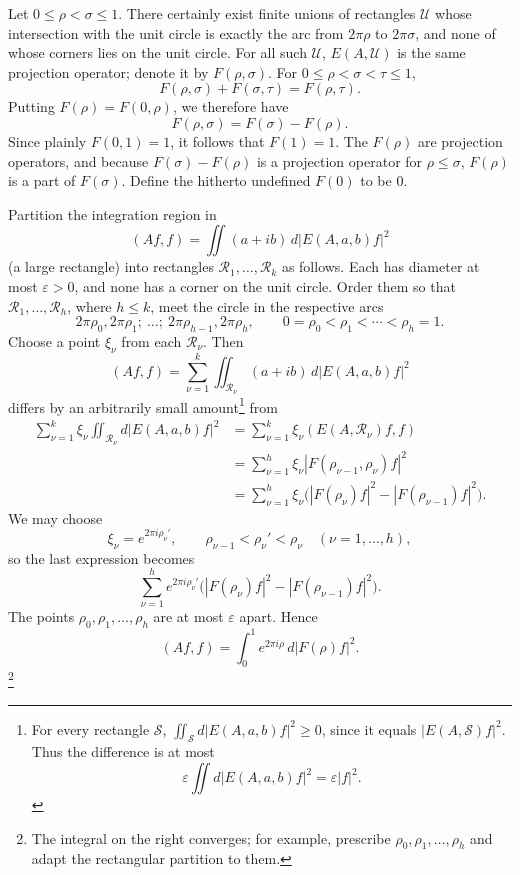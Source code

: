 ﻿\documentclass[paper=b5,fontsize=13pt,bookmarkpackage=false,twoside]{scrartcl}
\begin{document}
Let \(0\leq\rho<\sigma\leq1\).  There certainly exist finite unions of
rectangles \(\mathcal U\) whose intersection with the unit circle is
exactly the arc from \(2\pi\rho\) to \(2\pi\sigma\), and none of whose
corners lies on the unit circle.  For all such \(\mathcal U\),
\(E(A,\mathcal U)\) is the same projection operator; denote it by
\(F(\rho,\sigma)\).  For \(0\leq\rho<\sigma<\tau\leq1\),
\[
  F(\rho,\sigma)+F(\sigma,\tau)=F(\rho,\tau).
\]
Putting \(F(\rho)=F(0,\rho)\), we therefore have
\[
  F(\rho,\sigma)=F(\sigma)-F(\rho).
\]
Since plainly \(F(0,1)=1\), it follows that \(F(1)=1\).  The \(F(\rho)\)
are projection operators, and because \(F(\sigma)-F(\rho)\) is a
projection operator for \(\rho\leq\sigma\), \(F(\rho)\) is a part of
\(F(\sigma)\).  Define the hitherto undefined \(F(0)\) to be \(0\).

Partition the integration region in
\[
  (Af,f)=\iint(a+ib)\,d|E(A,a,b)f|^2
\]
(a large rectangle) into rectangles
\(\mathcal R_1,\ldots,\mathcal R_k\) as follows.  Each has diameter at
most \(\varepsilon>0\), and none has a corner on the unit circle.
Order them so that \(\mathcal R_1,\ldots,\mathcal R_h\), where
\(h\leq k\), meet the circle in the respective arcs
\[
  2\pi\rho_0,2\pi\rho_1;\ \ldots;\
  2\pi\rho_{h-1},2\pi\rho_h,
  \qquad
  0=\rho_0<\rho_1<\cdots<\rho_h=1.
\]
Choose a point \(\xi_\nu\) from each \(\mathcal R_\nu\).  Then
\[
  (Af,f)
  =\sum_{\nu=1}^{k}\iint_{\mathcal R_\nu}
      (a+ib)\,d|E(A,a,b)f|^2
\]
differs by an arbitrarily small amount\footnote{\label{fn:72}For every rectangle
\(\mathcal S\),
\(\iint_{\mathcal S}d|E(A,a,b)f|^2\geq0\), since it equals
\(|E(A,\mathcal S)f|^2\).  Thus the difference is at most
\[
  \varepsilon\iint d|E(A,a,b)f|^2
  =\varepsilon|f|^2.
\]}
from
\begin{align*}
 \sum_{\nu=1}^{k}\xi_\nu
    \iint_{\mathcal R_\nu}d|E(A,a,b)f|^2
 &=\sum_{\nu=1}^{k}\xi_\nu(E(A,\mathcal R_\nu)f,f)\\
 &=\sum_{\nu=1}^{h}\xi_\nu|F(\rho_{\nu-1},\rho_\nu)f|^2\\
 &=\sum_{\nu=1}^{h}\xi_\nu
   \bigl(|F(\rho_\nu)f|^2-|F(\rho_{\nu-1})f|^2\bigr).
\end{align*}
We may choose
\[
  \xi_\nu=e^{2\pi i\rho_\nu'},
  \qquad
  \rho_{\nu-1}<\rho_\nu'<\rho_\nu
  \quad(\nu=1,\ldots,h),
\]
so the last expression becomes
\[
  \sum_{\nu=1}^{h}e^{2\pi i\rho_\nu'}
   \bigl(|F(\rho_\nu)f|^2-|F(\rho_{\nu-1})f|^2\bigr).
\]
The points \(\rho_0,\rho_1,\ldots,\rho_h\) are at most
\(\varepsilon\) apart.  Hence
\[
  (Af,f)=\int_0^1e^{2\pi i\rho}\,d|F(\rho)f|^2.
\]
\footnote{\label{fn:73}The integral on the right converges; for example, prescribe
\(\rho_0,\rho_1,\ldots,\rho_h\) and adapt the rectangular partition to
them.}
\end{document}
